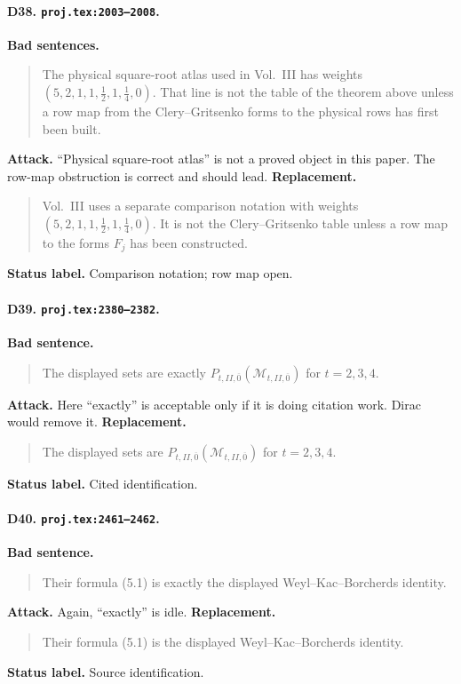 \paragraph{D38. \texttt{proj.tex:2003--2008}.}
\textbf{Bad sentences.}
\begin{quote}\small
The physical square-root atlas used in Vol.~III has weights
\((5,2,1,1,\tfrac12,1,\tfrac14,0)\).  That line is not the table of the
theorem above unless a row map from the Clery--Gritsenko forms to the
physical rows has first been built.
\end{quote}
\textbf{Attack.}
``Physical square-root atlas'' is not a proved object in this paper.
The row-map obstruction is correct and should lead.
\textbf{Replacement.}
\begin{quote}\small
Vol.~III uses a separate comparison notation with weights
\((5,2,1,1,\tfrac12,1,\tfrac14,0)\).  It is not the
Clery--Gritsenko table unless a row map to the forms \(F_j\) has been
constructed.
\end{quote}
\textbf{Status label.} Comparison notation; row map open.

\paragraph{D39. \texttt{proj.tex:2380--2382}.}
\textbf{Bad sentence.}
\begin{quote}\small
The displayed sets are exactly
\(P_{t,II,\overline0}(\mathcal M_{t,II,\overline0})\) for \(t=2,3,4\).
\end{quote}
\textbf{Attack.}
Here ``exactly'' is acceptable only if it is doing citation work.  Dirac
would remove it.
\textbf{Replacement.}
\begin{quote}\small
The displayed sets are
\(P_{t,II,\overline0}(\mathcal M_{t,II,\overline0})\) for \(t=2,3,4\).
\end{quote}
\textbf{Status label.} Cited identification.

\paragraph{D40. \texttt{proj.tex:2461--2462}.}
\textbf{Bad sentence.}
\begin{quote}\small
Their formula (5.1) is exactly the displayed Weyl--Kac--Borcherds
identity.
\end{quote}
\textbf{Attack.}
Again, ``exactly'' is idle.
\textbf{Replacement.}
\begin{quote}\small
Their formula (5.1) is the displayed Weyl--Kac--Borcherds identity.
\end{quote}
\textbf{Status label.} Source identification.

